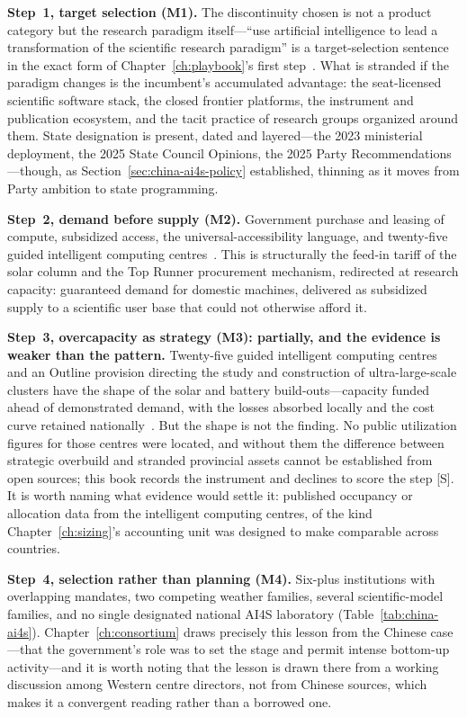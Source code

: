 \textbf{Step~1, target selection (M1).} The discontinuity chosen is not a product category but the research paradigm itself---``use artificial intelligence to lead a transformation of the scientific research paradigm'' is a target-selection sentence in the exact form of Chapter~\ref{ch:playbook}'s first step~\cite{fyp15-ai4s}. What is stranded if the paradigm changes is the incumbent's accumulated advantage: the seat-licensed scientific software stack, the closed frontier platforms, the instrument and publication ecosystem, and the tacit practice of research groups organized around them. State designation is present, dated and layered---the 2023 ministerial deployment, the 2025 State Council Opinions, the 2025 Party Recommendations---though, as Section~\ref{sec:china-ai4s-policy} established, thinning as it moves from Party ambition to state programming.

\textbf{Step~2, demand before supply (M2).} Government purchase and leasing of compute, subsidized access, the universal-accessibility language, and twenty-five guided intelligent computing centres~\cite{fyp15-ai4s,pengcheng-cloudbrain}. This is structurally the feed-in tariff of the solar column and the Top Runner procurement mechanism, redirected at research capacity: guaranteed demand for domestic machines, delivered as subsidized supply to a scientific user base that could not otherwise afford it.

\textbf{Step~3, overcapacity as strategy (M3): partially, and the evidence is weaker than the pattern.} Twenty-five guided intelligent computing centres and an Outline provision directing the study and construction of ultra-large-scale clusters have the shape of the solar and battery build-outs---capacity funded ahead of demonstrated demand, with the losses absorbed locally and the cost curve retained nationally~\cite{pengcheng-cloudbrain,fyp15-ai4s}. But the shape is not the finding. No public utilization figures for those centres were located, and without them the difference between strategic overbuild and stranded provincial assets cannot be established from open sources; this book records the instrument and declines to score the step [S]. It is worth naming what evidence would settle it: published occupancy or allocation data from the intelligent computing centres, of the kind Chapter~\ref{ch:sizing}'s accounting unit was designed to make comparable across countries.

\textbf{Step~4, selection rather than planning (M4).} Six-plus institutions with overlapping mandates, two competing weather families, several scientific-model families, and no single designated national AI4S laboratory (Table~\ref{tab:china-ai4s}). Chapter~\ref{ch:consortium} draws precisely this lesson from the Chinese case---that the government's role was to set the stage and permit intense bottom-up activity---and it is worth noting that the lesson is drawn there from a working discussion among Western centre directors, not from Chinese sources, which makes it a convergent reading rather than a borrowed one.

